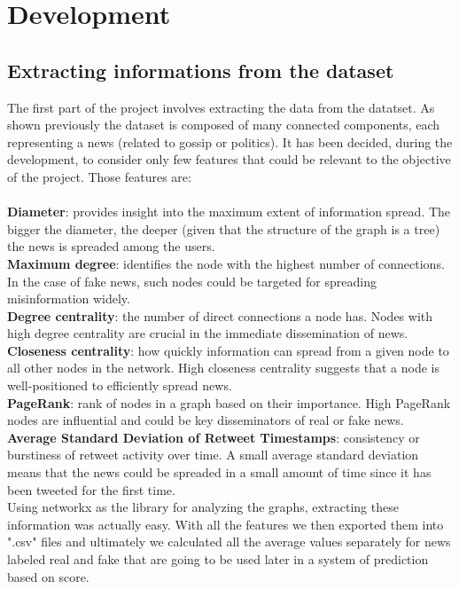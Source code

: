 \documentclass[11pt,a4paper]{article}
\begin{document}
\section*{Development}

\subsection*{Extracting informations from the dataset}

The first part of the project involves extracting the data from the datatset. As shown previously the dataset is composed of many connected components, each representing a news (related to gossip or politics). It has been decided, during the development, to consider only few features that could be relevant to the objective of the project.
Those features are:\\\\
\textbf{Diameter}: provides insight into the maximum extent of information spread. The bigger the diameter, the deeper (given that the structure of the graph is a tree) the news is spreaded among the users.\\
\textbf{Maximum degree}: identifies the node with the highest number of connections. In the case of fake news, such nodes could be targeted for spreading misinformation widely.\\
\textbf{Degree centrality}: the number of direct connections a node has. Nodes with high degree centrality are crucial in the immediate dissemination of news.\\
\textbf{Closeness centrality}: how quickly information can spread from a given node to all other nodes in the network. High closeness centrality suggests that a node is well-positioned to efficiently spread news.\\
\textbf{PageRank}: rank of nodes in a graph based on their importance. High PageRank nodes are influential and could be key disseminators of real or fake news.\\
\textbf{Average Standard Deviation of Retweet Timestamps}: consistency or burstiness of retweet activity over time. A small average standard deviation means that the news could be spreaded in a small amount of time since it has been tweeted for the first time.\\

Using networkx\cite{networkx} as the library for analyzing the graphs, extracting these information was actually easy. With all the features we then exported them into ".csv" files and ultimately we calculated all the average values separately for news labeled real and fake that are going to be used later in a system of prediction based on score.
\end{document}
